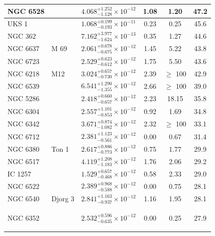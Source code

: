 \begin{longtable}{|l|l|l|c|c|c|}
NGC 6528 & & $4.068^{+1.252}_{-1.128} \times 10^{-12}$ & 1.08 & 1.20 & 47.2 \\\hline
UKS 1 & & $1.068^{+0.199}_{-0.193} \times 10^{-11}$ & 0.23 & 0.25 & 45.6 \\\hline
NGC 362 & & $7.162^{+3.977}_{-1.624} \times 10^{-13}$ & 0.35 & 1.27 & 44.6 \\\hline
NGC 6637 & M 69 & $2.061^{+0.678}_{-0.675} \times 10^{-12}$ & 1.45 & 5.22 & 43.8 \\\hline
NGC 6723 & & $2.529^{+0.623}_{-0.612} \times 10^{-12}$ & 1.75 & 5.50 & 43.6 \\\hline
NGC 6218 & M12 & $3.024^{+0.657}_{-0.730} \times 10^{-12}$ & 2.39 & $\geq$ 100 & 42.9 \\\hline
NGC 6539 & & $6.541^{+1.290}_{-1.355} \times 10^{-12}$ & 2.66 & $\geq$ 100 & 39.0 \\\hline
NGC 5286 & & $2.418^{+0.660}_{-0.657} \times 10^{-12}$ & 2.23 & 18.15 & 35.8 \\\hline
NGC 6304 & & $2.557^{+1.101}_{-0.853} \times 10^{-12}$ & 0.92 & 1.69 & 34.8 \\\hline
NGC 6342 & & $3.671^{+0.874}_{-1.082} \times 10^{-12}$ & 2.32 & $\geq$ 100 & 33.1 \\\hline
NGC 6712 & & $2.381^{+1.123}_{-0.561} \times 10^{-12}$ & 0.00 & 0.67 & 31.4 \\\hline
NGC 6380 & Ton 1 & $2.617^{+0.886}_{-0.773} \times 10^{-12}$ & 0.75 & 1.77 & 29.9 \\\hline
NGC 6517 & & $4.119^{+1.208}_{-1.183} \times 10^{-12}$ & 1.76 & 2.06 & 29.2 \\\hline
IC 1257 & & $1.529^{+0.657}_{-0.468} \times 10^{-12}$ & 0.58 & 2.33 & 29.0 \\\hline
NGC 6522 & & $2.389^{+0.968}_{-0.588} \times 10^{-12}$ & 0.00 & 0.75 & 28.1 \\\hline
NGC 6540 & Djorg 3 & $2.841^{+1.163}_{-0.937} \times 10^{-12}$ & 1.16 & 1.95 & 28.1 \\\hline
NGC 6352 & & $2.532^{+0.596}_{-0.635} \times 10^{-12}$ & 0.00 & 0.25 & 27.9

\label{tab:high_TS}
\end{longtable}
\endgroup
